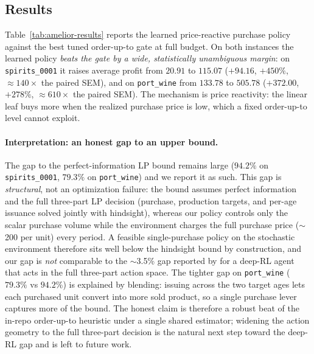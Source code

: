 \subsection{Results}
\label{sec:amelior-results}

Table~\ref{tab:amelior-results} reports the learned price-reactive purchase policy against the best
tuned order-up-to gate at full budget. On both instances the learned policy \emph{beats the gate by a
wide, statistically unambiguous margin}: on \texttt{spirits\_0001} it raises average profit from
$20.91$ to $115.07$ ($+94.16$, $+450\%$, $\approx140\times$ the paired SEM), and on \texttt{port\_wine}
from $133.78$ to $505.78$ ($+372.00$, $+278\%$, $\approx610\times$ the paired SEM). The mechanism is
price reactivity: the linear leaf buys more when the realized purchase price is low, which a fixed
order-up-to level cannot exploit.

\paragraph{Interpretation: an honest gap to an upper bound.}
The gap to the perfect-information LP bound remains large ($94.2\%$ on \texttt{spirits\_0001},
$79.3\%$ on \texttt{port\_wine}) and we report it as such. This gap is \emph{structural}, not an
optimization failure: the bound assumes perfect information and the full three-part LP decision
(purchase, production targets, and per-age issuance solved jointly with hindsight), whereas our policy
controls only the scalar purchase volume while the environment charges the full purchase price
($\sim$200 per unit) every period. A feasible single-purchase policy on the stochastic environment
therefore sits well below the hindsight bound by construction, and our gap is \emph{not} comparable to
the $\sim$3.5\% gap reported by \citet{pahrGrunow2025} for a deep-RL agent that acts in the full
three-part action space. The tighter gap on \texttt{port\_wine} ($79.3\%$ vs $94.2\%$) is explained by
blending: issuing across the two target ages lets each purchased unit convert into more sold product,
so a single purchase lever captures more of the bound. The honest claim is therefore a robust beat of
the in-repo order-up-to heuristic under a single shared estimator; widening the action geometry to the
full three-part decision is the natural next step toward the deep-RL gap and is left to future work.

